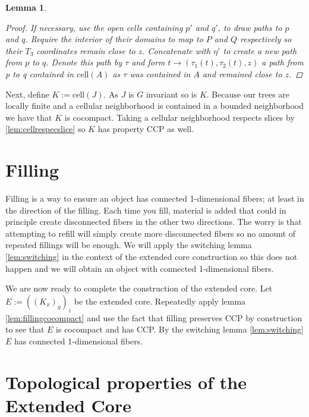 \documentclass[12pt,parskip=full]{report}
\theoremstyle{plain}
\newtheorem{lem}[thm]{Lemma}
\theoremstyle{definition}
\begin{document}
\begin{lem}
\begin{proof}
If necessary, use the open cells containing \(p'\) and \(q'\), to draw paths  to \(p\) and \(q\). Require the interior of their domains to map to \(P\) and \(Q\) respectively so their \(T_3\) coordinates remain close to \(z\). Concatenate with \(\eta'\) to create a new path from \(p\) to \(q\). Denote this path by \(\tau\) and form \(t\to (\tau_1(t), \tau_2(t), z)\) a path from p to q contained in \(\text{cell}(A)\) as \(\tau\) was contained in \(A\) and remained close to \(z\).
    
    \end{proof}
    
    
\end{lem}

        
        
        Next, define \(K := \text{cell}(J)\). As \(J\) is \(G\) invariant so is \(K\).  Because our trees are locally finite and a cellular neighborhood is contained in a bounded neighborhood we have that \(K\) is cocompact. Taking a cellular neighborhood respects slices by \ref{lem:cellrespecslice}  so \(K\) has property CCP as well.

\section{Filling}


Filling is a way to ensure an object has connected 1-dimensional fibers; at least in the direction of the filling. Each time you fill, material is added that could in principle create disconnected fibers in the other two  directions. The worry is that attempting to refill will simply create more disconnected fibers so no amount of repeated fillings will be enough. We will apply the switching lemma \ref{lem:switching} in the context of the extended core construction so this does not happen and we will obtain an object with connected 1-dimensional fibers. 



We are now ready to complete the construction of the extended core. Let \(E:= ((K_x)_y)_z\) be the extended core. Repeatedly apply lemma \ref{lem:fillingcocompact} and use the fact that filling preserves CCP by construction to see that \(E\) is cocompact and has CCP. By  the switching lemma \ref{lem:switching} \(E\) has connected 1-dimensional fibers. 

\section{Topological properties of the Extended Core}
\end{document}
